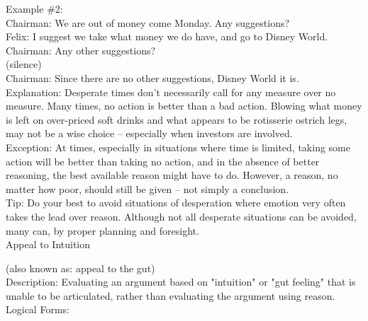 \documentclass[a4paper,12pt,single,pdftex]{scrartcl}
\begin{document}
    
      Example \#2:
    \\

    
      Chairman: We are out of money come Monday.  Any suggestions?
    \\

    
      Felix: I suggest we take what money we do have, and go to Disney World.
    \\

    
      Chairman: Any other suggestions?
    \\

    
      (silence)
    \\

    
      Chairman: Since there are no other suggestions, Disney World it is.
    \\

    
      Explanation: Desperate times don’t necessarily call for any measure over no measure.  Many times, no action is better than a bad action.  Blowing what money is left on over-priced soft drinks and what appears to be rotisserie ostrich legs, may not be a wise choice -- especially when investors are involved.
    \\

    
      Exception: At times, especially in situations where time is limited, taking some action will be better than taking no action, and in the absence of better reasoning, the best available reason might have to do.  However, a reason, no matter how poor, should still be given -- not simply a conclusion.
    \\

    
      Tip: Do your best to avoid situations of desperation where emotion very often takes the lead over reason.  Although not all desperate situations can be avoided, many can, by proper planning and foresight.
    \\

  

Appeal to Intuition
    
      (also known as: appeal to the gut)
    \\

  
    
      Description: Evaluating an argument based on "intuition" or "gut feeling" that is unable to be articulated, rather than evaluating the argument using reason.
    \\

    
      Logical Forms:
    \\
\end{document}
